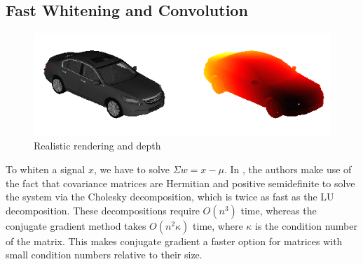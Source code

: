 \documentclass[10pt,twocolumn,letterpaper]{article}
\newcommand{\scream}[1]{{\color{red} \bf *** #1 ***}}
\begin{document}
\subsection{Fast Whitening and Convolution}
\label{sec:fast_whitening}
\begin{figure}[t]
  \begin{center}
     \includegraphics[width=0.9\linewidth]{whiten_orig_depth} 
  \end{center}
  \caption{Realistic rendering and depth}
  \label{fig:rendering}
  \end{figure}
 
To whiten a signal $x$, we have to solve $\Sigma w = x - \mu$. In
\cite{Hariharan12}, the authors make use of the fact that covariance matrices
are Hermitian and positive semidefinite to solve the system via the Cholesky
decomposition, which is twice as fast as the LU decomposition. These
decompositions require $O(n^3)$ time, whereas the conjugate gradient method
takes $O(n^2\kappa)$ time, where $\kappa$ is the condition number of the matrix.
This makes conjugate gradient a faster option for matrices with small condition
numbers relative to their size.


% 
  
\end{document}
